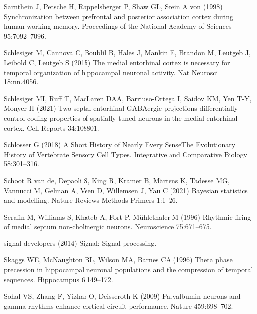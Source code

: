 \documentclass[
  12pt,
  a4paper,
  openany]{book}
\newlength{\cslhangindent}
\newlength{\cslentryspacingunit} %
\newenvironment{CSLReferences}[2] %
 {%
  \setlength{\parindent}{0pt}
  \ifodd #1
  \let\oldpar\par
  \def\par{\hangindent=\cslhangindent\oldpar}
  \fi
  \setlength{\parskip}{#2\cslentryspacingunit}
 }%
 {}
\begin{document}
\begin{CSLReferences}{1}{0}
\leavevmode{}%
Sarnthein J, Petsche H, Rappelsberger P, Shaw GL, Stein A von (1998) Synchronization between prefrontal and posterior association cortex during human working memory. Proceedings of the National Academy of Sciences 95:7092--7096.

\leavevmode{}%
Schlesiger M, Cannova C, Boublil B, Hales J, Mankin E, Brandon M, Leutgeb J, Leibold C, Leutgeb S (2015) The medial entorhinal cortex is necessary for temporal organization of hippocampal neuronal activity. Nat Neurosci 18:nn.4056.

\leavevmode{}%
Schlesiger MI, Ruff T, MacLaren DAA, Barriuso-Ortega I, Saidov KM, Yen T-Y, Monyer H (2021) Two septal-entorhinal {GABAergic} projections differentially control coding properties of spatially tuned neurons in the medial entorhinal cortex. Cell Reports 34:108801.

\leavevmode{}%
Schlosser G (2018) A {Short} {History} of {Nearly} {Every} {Sense}{\textemdash}{The} {Evolutionary} {History} of {Vertebrate} {Sensory} {Cell} {Types}. Integrative and Comparative Biology 58:301--316.

\leavevmode{}%
Schoot R van de, Depaoli S, King R, Kramer B, Märtens K, Tadesse MG, Vannucci M, Gelman A, Veen D, Willemsen J, Yau C (2021) Bayesian statistics and modelling. Nature Reviews Methods Primers 1:1--26.

\leavevmode{}%
Serafin M, Williams S, Khateb A, Fort P, Mühlethaler M (1996) Rhythmic firing of medial septum non-cholinergic neurons. Neuroscience 75:671--675.

\leavevmode{}%
signal developers (2014) Signal: {Signal} processing.

\leavevmode{}%
Skaggs WE, McNaughton BL, Wilson MA, Barnes CA (1996) Theta phase precession in hippocampal neuronal populations and the compression of temporal sequences. Hippocampus 6:149--172.

\leavevmode{}%
Sohal VS, Zhang F, Yizhar O, Deisseroth K (2009) Parvalbumin neurons and gamma rhythms enhance cortical circuit performance. Nature 459:698--702.


\end{CSLReferences}
\end{document}
